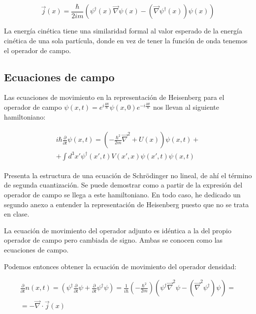 \documentclass{article} %
\begin{document}
$$
\vec{j}(x) = \frac{\hbar}{2im} \left( \psi^{\dagger}(x) \vec{\nabla} \psi(x) - (\vec{\nabla} \psi^{\dagger}(x))\psi(x) \right)
$$

La energía cinética tiene una similaridad formal al valor esperado de la energía cinética de una sola partícula, donde en vez de tener la función de onda tenemos el operador de campo.

\subsection{Ecuaciones de campo}

Las ecuaciones de movimiento en la representación de Heisenberg para el operador de campo $\psi(x, t) = e^{i\frac{Ht}{\hbar}} \psi(x, 0) e^{-i\frac{Ht}{\hbar}}$ nos llevan al siguiente hamiltoniano:

\begin{align}
\begin{split}
i\hbar\frac{\partial}{\partial t} \psi(x, t) = \left(-\frac{\hbar^2}{2m} \vec{\nabla}^2 + U(x) \right) \psi(x, t) + \\ + \int d^3x' \psi^{\dagger}(x', t) V(x', x) \psi(x',t) \psi(x, t)
\end{split}
\label{eq:SQHam}
\end{align}

Presenta la estructura de una ecuación de Schrödinger no lineal, de ahí el término de segunda cuantización. Se puede demostrar como a partir de la expresión del operador de campo se llega a este hamiltoniano. En todo caso, he dedicado un segundo anexo a entender la representación de Heisenberg puesto que no se trata en clase.

La ecuación de movimiento del operador adjunto es idéntica a la del propio operador de campo pero cambiada de signo. Ambas se conocen como las ecuaciones de campo.

Podemos entonces obtener la ecuación de movimiento del operador densidad:

\begin{equation}
\begin{split}
\frac{\partial}{\partial t} n(x, t) = \left( \psi^{\dagger} \frac{\partial}{\partial t} \psi + \frac{\partial}{\partial t} \psi^{\dagger} \psi \right) = \frac{1}{i\hbar} \left( - \frac{\hbar^2}{2m} \right)\left( \psi^{\dagger} \vec{\nabla}^2 \psi - (\vec{\nabla}^2 \psi^{\dagger} ) \psi \right) = \\ = - \vec{\nabla} \cdot \vec{j} (x)
\end{split}
\end{equation}
\end{document}
